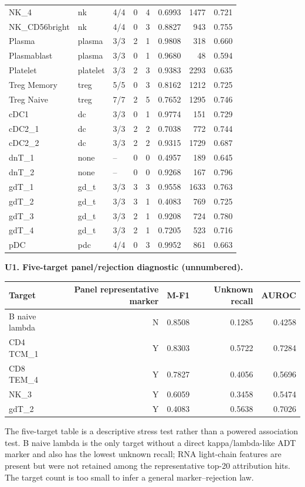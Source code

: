\begin{longtable}{@{}p{2.2cm}p{1.0cm}p{0.9cm}rrrrr@{}}
NK\_4 & nk & 4/4 & 0 & 4 & 0.6993 & 1477 & 0.721 \\
NK\_CD56bright & nk & 4/4 & 0 & 3 & 0.8827 & 943 & 0.755 \\
Plasma & plasma & 3/3 & 2 & 1 & 0.9808 & 318 & 0.660 \\
Plasmablast & plasma & 3/3 & 0 & 1 & 0.9680 & 48 & 0.594 \\
Platelet & platelet & 3/3 & 2 & 3 & 0.9383 & 2293 & 0.635 \\
Treg Memory & treg & 5/5 & 0 & 3 & 0.8162 & 1212 & 0.725 \\
Treg Naive & treg & 7/7 & 2 & 5 & 0.7652 & 1295 & 0.746 \\
cDC1 & dc & 3/3 & 0 & 1 & 0.9774 & 151 & 0.729 \\
cDC2\_1 & dc & 3/3 & 2 & 2 & 0.7038 & 772 & 0.744 \\
cDC2\_2 & dc & 3/3 & 2 & 2 & 0.9315 & 1729 & 0.687 \\
dnT\_1 & none & -- & 0 & 0 & 0.4957 & 189 & 0.645 \\
dnT\_2 & none & -- & 0 & 0 & 0.9268 & 167 & 0.796 \\
gdT\_1 & gd\_t & 3/3 & 3 & 3 & 0.9558 & 1633 & 0.763 \\
gdT\_2 & gd\_t & 3/3 & 3 & 1 & 0.4083 & 769 & 0.725 \\
gdT\_3 & gd\_t & 3/3 & 2 & 1 & 0.9208 & 724 & 0.780 \\
gdT\_4 & gd\_t & 3/3 & 2 & 1 & 0.7205 & 523 & 0.716 \\
pDC & pdc & 4/4 & 0 & 3 & 0.9952 & 861 & 0.663 \\
\bottomrule
\end{longtable}

\noindent\textbf{U1. Five-target panel/rejection diagnostic (unnumbered).}
\begin{center}
\begin{tabular}{@{}lrrrr@{}}
\toprule
Target & Panel representative marker & M-F1 & Unknown recall & AUROC \\
\midrule
B naive lambda & N & 0.8508 & 0.1285 & 0.4258 \\
CD4 TCM\_1 & Y & 0.8303 & 0.5722 & 0.7284 \\
CD8 TEM\_4 & Y & 0.7827 & 0.4056 & 0.5696 \\
NK\_3 & Y & 0.6059 & 0.3458 & 0.5474 \\
gdT\_2 & Y & 0.4083 & 0.5638 & 0.7026 \\
\bottomrule
\end{tabular}
\end{center}
\noindent The five-target table is a descriptive stress test rather than a powered association test. B naive lambda is the only target without a direct kappa/lambda-like ADT marker and also has the lowest unknown recall; RNA light-chain features are present but were not retained among the representative top-20 attribution hits. The target count is too small to infer a general marker--rejection law.

